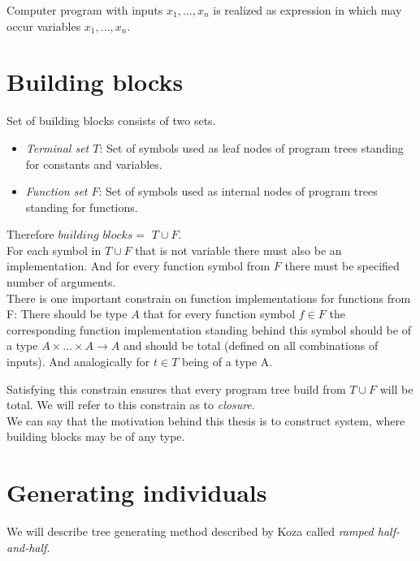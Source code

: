 \documentclass[12pt,a4paper]{report}
\begin{document}
Computer program with inputs $x_{1}, ..., x_{n}$ is realized as expression in which 
may occur variables $x_{1}, ..., x_{n}$.



\section{Building blocks}
\label{building-blocks}

Set of building blocks consists of two sets.

\begin{itemize}
	\item \textit{Terminal set $T$}: Set of symbols used as leaf nodes of 	               
	      program trees standing for constants and variables.
	\item \textit{Function set $F$}: Set of symbols used as internal nodes 
	      of program trees standing for functions.
\end{itemize}

\newcommand{\TuF}{$T \cup F$\xspace}

Therefore $building$ $blocks = $ \TuF.\\

For each symbol in \TuF that is not variable 
there must also be an implementation.
And for every function symbol from $F$ there must be specified 
number of arguments.\\

There is one important constrain on function implementations for functions from F:
There should be type $A$ that for every function symbol $f \in F$ the corresponding function implementation standing behind this symbol should be of a type 
$A \times ... \times A \rightarrow A$ and should be total (defined on all
combinations of inputs). And analogically for $t \in T$ being of a type A.  

Satisfying this constrain ensures that every program tree build 
from \TuF will be total. We will refer to this constrain as to \textit{closure}.\\

We can say that the motivation behind this thesis is to construct system,
where building blocks may be of any type. 

\section{Generating individuals}
\label{GPgene}

We will describe tree generating method described by Koza \cite{koza92}
called \textit{ramped half-and-half}. \\
\end{document}
